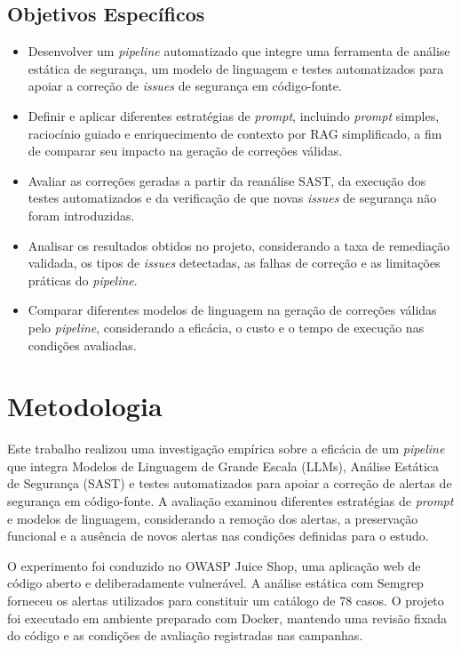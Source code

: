\subsection{Objetivos Específicos}
\begin{itemize}
\item Desenvolver um \textit{pipeline} automatizado que integre uma ferramenta de análise estática de segurança, um modelo de linguagem e testes automatizados para apoiar a correção de \textit{issues} de segurança em código-fonte.

\item Definir e aplicar diferentes estratégias de \textit{prompt}, incluindo \textit{prompt} simples, raciocínio guiado e enriquecimento de contexto por RAG simplificado, a fim de comparar seu impacto na geração de correções válidas.

\item Avaliar as correções geradas a partir da reanálise SAST, da execução dos testes automatizados e da verificação de que novas \textit{issues} de segurança não foram introduzidas.

\item Analisar os resultados obtidos no projeto, considerando a taxa de remediação validada, os tipos de \textit{issues} detectadas, as falhas de correção e as limitações práticas do \textit{pipeline}.

\item Comparar diferentes modelos de linguagem na geração de correções válidas pelo \textit{pipeline}, considerando a eficácia, o custo e o tempo de execução nas condições avaliadas.

\end{itemize}


\section{Metodologia}
Este trabalho realizou uma investigação empírica sobre a eficácia de um \textit{pipeline} que integra Modelos de Linguagem de Grande Escala (LLMs), Análise Estática de Segurança (SAST) e testes automatizados para apoiar a correção de alertas de segurança em código-fonte. A avaliação examinou diferentes estratégias de \textit{prompt} e modelos de linguagem, considerando a remoção dos alertas, a preservação funcional e a ausência de novos alertas nas condições definidas para o estudo.

O experimento foi conduzido no OWASP Juice Shop, uma aplicação web de código aberto e deliberadamente vulnerável. A análise estática com Semgrep forneceu os alertas utilizados para constituir um catálogo de 78 casos. O projeto foi executado em ambiente preparado com Docker, mantendo uma revisão fixada do código e as condições de avaliação registradas nas campanhas.

